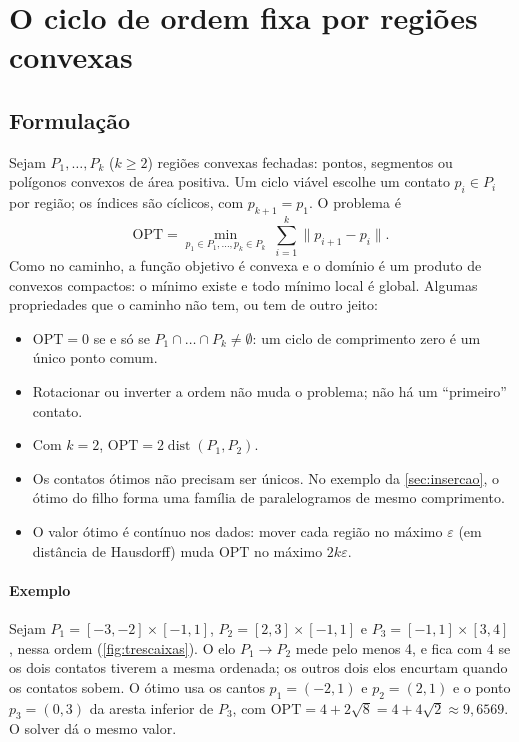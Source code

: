 \documentclass[11pt,a4paper]{article}
\theoremstyle{plain}\newtheorem{proposicao}{Proposição}
\theoremstyle{definition}\newtheorem{definicao}{Definição}
\theoremstyle{plain}\newtheorem{teorema}{Teorema}
\theoremstyle{plain}\newtheorem{lema}{Lema}
\newcommand{\norm}[1]{\lVert#1\rVert}
\newcommand{\OPT}{\mathrm{OPT}}
\DeclareMathOperator{\dist}{dist}
\begin{document}
\section{O ciclo de ordem fixa por regiões convexas}\label{sec:ciclo}

\subsection{Formulação}
Sejam \(P_1,\dots,P_k\) (\(k\ge2\)) regiões convexas fechadas: pontos, segmentos ou polígonos convexos de área positiva. Um ciclo viável escolhe um contato \(p_i\in P_i\) por região; os índices são cíclicos, com \(p_{k+1}=p_1\). O problema é
\begin{equation}\label{eq:ciclo}
\OPT=\min_{p_1\in P_1,\dots,p_k\in P_k}\;\sum_{i=1}^{k}\norm{p_{i+1}-p_i}.
\end{equation}
Como no caminho, a função objetivo é convexa e o domínio é um produto de convexos compactos: o mínimo existe e todo mínimo local é global. Algumas propriedades que o caminho não tem, ou tem de outro jeito:
\begin{itemize}[leftmargin=*,itemsep=1pt]
\item \(\OPT=0\) se e só se \(P_1\cap\dots\cap P_k\ne\emptyset\): um ciclo de comprimento zero é um único ponto comum.
\item Rotacionar ou inverter a ordem não muda o problema; não há um ``primeiro'' contato.
\item Com \(k=2\), \(\OPT=2\dist(P_1,P_2)\).
\item Os contatos ótimos não precisam ser únicos. No exemplo da \cref{sec:insercao}, o ótimo do filho forma uma família de paralelogramos de mesmo comprimento.
\item O valor ótimo é contínuo nos dados: mover cada região no máximo \(\varepsilon\) (em distância de Hausdorff) muda \(\OPT\) no máximo \(2k\varepsilon\).
\end{itemize}

\paragraph{Exemplo} Sejam \(P_1=[-3,-2]\times[-1,1]\), \(P_2=[2,3]\times[-1,1]\) e \(P_3=[-1,1]\times[3,4]\), nessa ordem (\cref{fig:trescaixas}). O elo \(P_1\to P_2\) mede pelo menos 4, e fica com 4 se os dois contatos tiverem a mesma ordenada; os outros dois elos encurtam quando os contatos sobem. O ótimo usa os cantos \(p_1=(-2,1)\) e \(p_2=(2,1)\) e o ponto \(p_3=(0,3)\) da aresta inferior de \(P_3\), com \(\OPT=4+2\sqrt8=4+4\sqrt2\approx9{,}6569\). O solver dá o mesmo valor.
\end{document}
